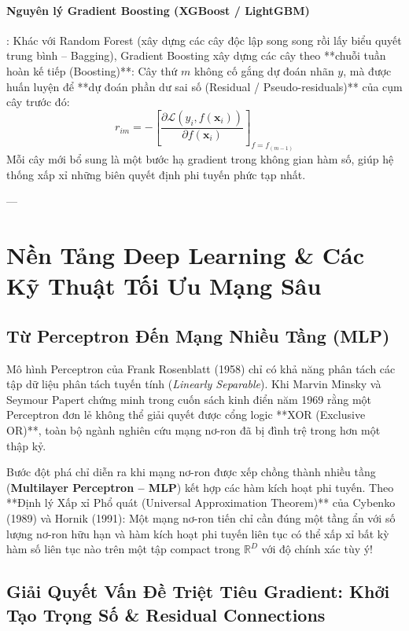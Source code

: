 \paragraph{Nguyên lý Gradient Boosting (XGBoost / LightGBM)}:
Khác với Random Forest (xây dựng các cây độc lập song song rồi lấy biểu quyết trung bình -- Bagging), Gradient Boosting xây dựng các cây theo **chuỗi tuần hoàn kế tiếp (Boosting)**:
Cây thứ $m$ không cố gắng dự đoán nhãn $y$, mà được huấn luyện để **dự đoán phần dư sai số (Residual / Pseudo-residuals)** của cụm cây trước đó:
\begin{equation}
r_{im} = - \left[ \frac{\partial \mathcal{L}(y_i, f(\mathbf{x}_i))}{\partial f(\mathbf{x}_i)} \right]_{f = f_{(m-1)}}
\label{eq:gradient-boosting-residuals}
\end{equation}
Mỗi cây mới bổ sung là một bước hạ gradient trong không gian hàm số, giúp hệ thống xấp xỉ những biên quyết định phi tuyến phức tạp nhất.

---

\section{Nền Tảng Deep Learning \& Các Kỹ Thuật Tối Ưu Mạng Sâu}
\label{sec:deep-learning-foundations}

\subsection{Từ Perceptron Đến Mạng Nhiều Tầng (MLP)}

Mô hình Perceptron của Frank Rosenblatt (1958) chỉ có khả năng phân tách các tập dữ liệu phân tách tuyến tính (\textit{Linearly Separable}). Khi Marvin Minsky và Seymour Papert chứng minh trong cuốn sách kinh điển năm 1969 rằng một Perceptron đơn lẻ không thể giải quyết được cổng logic **XOR (Exclusive OR)**, toàn bộ ngành nghiên cứu mạng nơ-ron đã bị đình trệ trong hơn một thập kỷ.

Bước đột phá chỉ diễn ra khi mạng nơ-ron được xếp chồng thành nhiều tầng (\textbf{Multilayer Perceptron -- MLP}) kết hợp các hàm kích hoạt phi tuyến. Theo **Định lý Xấp xỉ Phổ quát (Universal Approximation Theorem)** của Cybenko (1989) và Hornik (1991): Một mạng nơ-ron tiến chỉ cần đúng một tầng ẩn với số lượng nơ-ron hữu hạn và hàm kích hoạt phi tuyến liên tục có thể xấp xỉ bất kỳ hàm số liên tục nào trên một tập compact trong $\mathbb{R}^D$ với độ chính xác tùy ý!

\subsection{Giải Quyết Vấn Đề Triệt Tiêu Gradient: Khởi Tạo Trọng Số \& Residual Connections}

